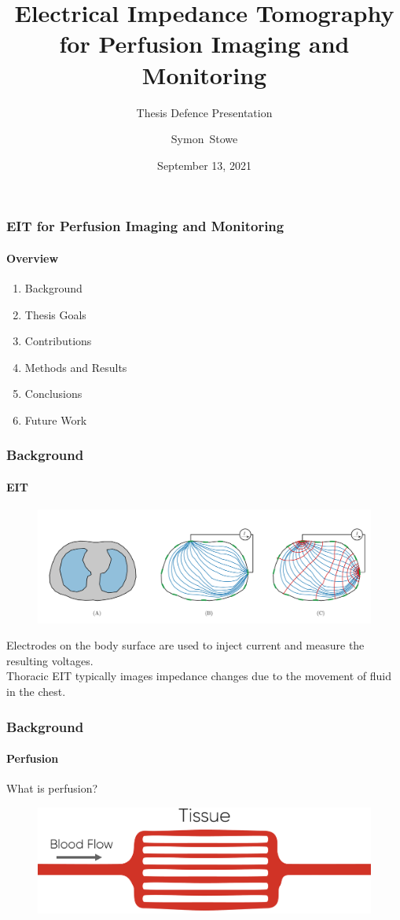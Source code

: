 \documentclass[10pt,    %
    english,            %
    xcolor=table,       %
    envcountsect,        %
    aspectratio=1610
]{beamer}
\title[] %
{Electrical Impedance Tomography for Perfusion Imaging and Monitoring}
\subtitle{Thesis Defence Presentation}
\date[] %
    {September 13, 2021}
\author[] %
{Symon~Stowe} %
\institute[] %
{\texttt{symonstowe@sce.carleton.ca}
}
\begin{document}
	
\begin{frame}
  \titlepage
\end{frame}

\begin{frame}
	\frametitle{EIT for Perfusion Imaging and Monitoring}
	\framesubtitle{Overview}
	\begin{enumerate}
		\item Background
		\item Thesis Goals
		\item Contributions
		\item Methods and Results
		\item Conclusions
		\item Future Work 
	\end{enumerate}
\end{frame}


\begin{frame}
	\frametitle{Background}
	\framesubtitle{EIT}
	\begin{figure}
		\centering
	\includegraphics[width=\textwidth,trim={0 2cm 0 0},clip]{imgs/current_and_equipotential_lines.pdf}
	\end{figure}
	\vspace{2mm}
	Electrodes on the body surface are used to inject current and measure the resulting voltages. \\
	\vspace{0.5cm}
	Thoracic EIT typically images impedance changes due to the movement of fluid in the chest. \\
\end{frame}

\begin{frame}
	\frametitle{Background}
	\framesubtitle{Perfusion}
	{\Large What is \alert{perfusion}?} \\ \vspace{2mm}
	\begin{figure}[H]
		\centering
		\includegraphics[width=\textwidth]{perfusion_sketch.pdf}
	\end{figure}

\end{frame}
\end{document}
